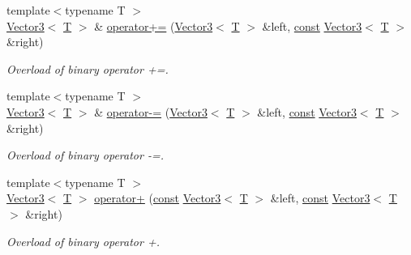 \begin{DoxyCompactItemize}
{\footnotesize template$<$typename T $>$ }\\\hyperlink{classsf_1_1_vector3}{Vector3}$<$ \hyperlink{curses_8priv_8h_a5ef253115820acf7d27f3c5c3b02a0f0}{T} $>$ \& \hyperlink{classsf_1_1_vector3_abc28859af163c63318ea2723b81c5ad9}{operator+=} (\hyperlink{classsf_1_1_vector3}{Vector3}$<$ \hyperlink{curses_8priv_8h_a5ef253115820acf7d27f3c5c3b02a0f0}{T} $>$ \&left, \hyperlink{term__entry_8h_a57bd63ce7f9a353488880e3de6692d5a}{const} \hyperlink{classsf_1_1_vector3}{Vector3}$<$ \hyperlink{curses_8priv_8h_a5ef253115820acf7d27f3c5c3b02a0f0}{T} $>$ \&right)
\begin{DoxyCompactList}\small\item\em Overload of binary operator +=. \end{DoxyCompactList}\item 
{\footnotesize template$<$typename T $>$ }\\\hyperlink{classsf_1_1_vector3}{Vector3}$<$ \hyperlink{curses_8priv_8h_a5ef253115820acf7d27f3c5c3b02a0f0}{T} $>$ \& \hyperlink{classsf_1_1_vector3_aa465672d2a4ee5fd354e585cf08d2ab9}{operator-\/=} (\hyperlink{classsf_1_1_vector3}{Vector3}$<$ \hyperlink{curses_8priv_8h_a5ef253115820acf7d27f3c5c3b02a0f0}{T} $>$ \&left, \hyperlink{term__entry_8h_a57bd63ce7f9a353488880e3de6692d5a}{const} \hyperlink{classsf_1_1_vector3}{Vector3}$<$ \hyperlink{curses_8priv_8h_a5ef253115820acf7d27f3c5c3b02a0f0}{T} $>$ \&right)
\begin{DoxyCompactList}\small\item\em Overload of binary operator -\/=. \end{DoxyCompactList}\item 
{\footnotesize template$<$typename T $>$ }\\\hyperlink{classsf_1_1_vector3}{Vector3}$<$ \hyperlink{curses_8priv_8h_a5ef253115820acf7d27f3c5c3b02a0f0}{T} $>$ \hyperlink{classsf_1_1_vector3_a6500a0cb00e07801e9e9d7e96852ddd3}{operator+} (\hyperlink{term__entry_8h_a57bd63ce7f9a353488880e3de6692d5a}{const} \hyperlink{classsf_1_1_vector3}{Vector3}$<$ \hyperlink{curses_8priv_8h_a5ef253115820acf7d27f3c5c3b02a0f0}{T} $>$ \&left, \hyperlink{term__entry_8h_a57bd63ce7f9a353488880e3de6692d5a}{const} \hyperlink{classsf_1_1_vector3}{Vector3}$<$ \hyperlink{curses_8priv_8h_a5ef253115820acf7d27f3c5c3b02a0f0}{T} $>$ \&right)
\begin{DoxyCompactList}\small\item\em Overload of binary operator +. \end{DoxyCompactList}\item 

\end{DoxyCompactItemize}
